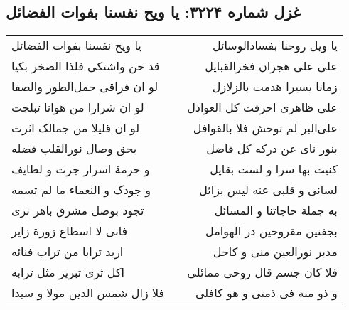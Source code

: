 \begin{center}
\section*{غزل شماره ۳۲۲۴: یا ویح نفسنا بفوات الفضائل}
\label{sec:3224}
\begin{longtable}{l p{0.5cm} r}
یا ویح نفسنا بفوات الفضائل
&&
یا ویل روحنا بفسادالوسائل
\\
قد حن واشتکی فلذا الصخر بکیا
&&
علی علی هجران فخرالقبایل
\\
لو ان فراقی حمل‌الطور والصفا
&&
زمانا یسیرا هدمت بالزلازل
\\
لو ان شرارا من هوانا تبلجت
&&
علی ظاهری احرقت کل العواذل
\\
لو ان قلیلا من جمالک اثرت
&&
علی‌البر لم توحش فلا بالقوافل
\\
بحق وصال نورالقلب فضله
&&
بنور نای عن درکه کل فاضل
\\
و حرمهٔ اسرار جرت و لطایف
&&
کنیت بها سرا و لست بقایل
\\
و جودک و النعماء ما لم تسمه
&&
لسانی و قلبی عنه لیس بزائل
\\
تجود بوصل مشرق باهر نری
&&
به جملة حاجاتنا و المسائل
\\
فانی لا اسطاع زورة زایر
&&
بجفنین مقروحین در الهوامل
\\
ارید ترابا من تراب فنائه
&&
مدبر نورالعین منی و کاحل
\\
اکل ثری تبریز مثل ترابه
&&
فلا کان جسم قال روحی ممائلی
\\
فلا زال شمس الدین مولا و سیدا
&&
و ذو منة فی ذمتی و هو کافلی
\\
\end{longtable}
\end{center}
